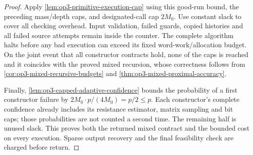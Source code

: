 \begin{proof}
Apply \cref{lem:op3-primitive-execution-cap} using this good-run bound,
the preceding mass/depth caps, and designated-call cap $2M_0$.
Use constant slack to cover all checking overhead. Input validation,
failed guards, copied histories and all failed source attempts remain
inside the counter. The complete algorithm halts before any bad execution
can exceed its fixed word-work/allocation budget. On the joint event
that all constructor contracts hold, none of the caps is reached and
it coincides with the proved mixed recursion, whose correctness follows
from \cref{cor:op3-mixed-recursive-budgets} and
\cref{thm:op3-mixed-proximal-accuracy}.

Finally, \cref{lem:op3-capped-adaptive-confidence} bounds the probability
of a first constructor failure by
$2M_0\cdot p/(4M_0)=p/2\leq p$. Each constructor's complete confidence
already includes its resistance estimator, matrix sampling and bit caps;
those probabilities are not counted a second time. The remaining half
is unused slack. This proves both the returned mixed contract and the
bounded cost on every execution. Sparse output recovery and the final
feasibility check are charged before return.
\end{proof}

